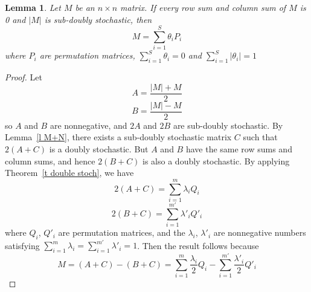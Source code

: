 \documentclass[12pt]{amsart}
\newtheorem{lem}[thm]{Lemma}
\begin{document}
\begin{lem}
\label{t sub stoch}
Let $M$ be an $n\times n$ matrix. If every row sum and column sum of
$M$ is 0 and $|M|$ is sub-doubly stochastic, then
\[M=\sum_{i=1}^S \theta _iP_i\] where $P_i$ are permutation matrices,
$\sum_{i=1}^S \theta _i=0$ and $\sum_{i=1}^S |\theta _i|=1$
\end{lem}

\begin{proof}
Let
\[A=\frac{|M|+M}{2}\]
\[B=\frac{|M|-M}{2}\]
so $A$ and $B$ are nonnegative, and $2A$ and $2B$ are sub-doubly
stochastic.
By Lemma~\ref{l M+N}, there exists a sub-doubly stochastic matrix $C$
such that $2(A+C)$ is a doubly stochastic. But $A$ and $B$ have
the same row sums and column sums, and hence $2(B+C)$ is also a doubly
stochastic. By applying Theorem~\ref{t double stoch}, we have
\[2(A+C)=\sum_{i=1}^m \lambda _iQ_i\]
\[2(B+C)=\sum_{i=1}^{m'} \lambda '_iQ'_i\]
where $Q_i$, $Q'_i$ are permutation matrices, and the $\lambda
_i$, $\lambda'_i$  are nonnegative numbers satisfying
$\sum_{i=1}^m \lambda_i =\sum_{i=1}^{m'} \lambda'_i =1$.
Then the result follows because
\[M=(A+C)-(B+C)=\sum_{i=1}^m \frac{\lambda _i}{2}Q_i -\sum_{i=1}^{m'} \frac{\lambda '_i}{2}Q'_i\]
\end{proof}
\end{document}
